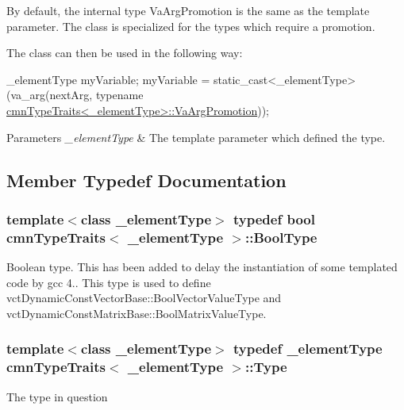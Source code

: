By default, the internal type Va\+Arg\+Promotion is the same as the template parameter. The class is specialized for the types which require a promotion.

The class can then be used in the following way\+:


\begin{DoxyCode}
\_elementType myVariable;
myVariable = \textcolor{keyword}{static\_cast<}\_elementType\textcolor{keyword}{>}(va\_arg(nextArg, \textcolor{keyword}{typename} 
      \hyperlink{classcmn_type_traits_a824cf785b2d249f59bf5d9f03c6e8049}{cmnTypeTraits<\_elementType>::VaArgPromotion}));
\end{DoxyCode}



\begin{DoxyParams}{Parameters}
{\em \+\_\+element\+Type} & The template parameter which defined the type. \\
\hline
\end{DoxyParams}


\subsection{Member Typedef Documentation}
\hypertarget{classcmn_type_traits_aaa41087228a7f165bcd9f4385e644e28}{}
\subsubsection[{Bool\+Type}]{\setlength{\rightskip}{0pt plus 5cm}template$<$class \+\_\+element\+Type$>$ typedef bool {\bf cmn\+Type\+Traits}$<$ \+\_\+element\+Type $>$\+::{\bf Bool\+Type}}\label{classcmn_type_traits_aaa41087228a7f165bcd9f4385e644e28}
Boolean type. This has been added to delay the instantiation of some templated code by gcc 4.. This type is used to define vct\+Dynamic\+Const\+Vector\+Base\+::\+Bool\+Vector\+Value\+Type and vct\+Dynamic\+Const\+Matrix\+Base\+::\+Bool\+Matrix\+Value\+Type. \hypertarget{classcmn_type_traits_aefe66f235207b010b396b5558529a1da}{}
\subsubsection[{Type}]{\setlength{\rightskip}{0pt plus 5cm}template$<$class \+\_\+element\+Type$>$ typedef \+\_\+element\+Type {\bf cmn\+Type\+Traits}$<$ \+\_\+element\+Type $>$\+::{\bf Type}}\label{classcmn_type_traits_aefe66f235207b010b396b5558529a1da}
The type in question \hypertarget{classcmn_type_traits_a824cf785b2d249f59bf5d9f03c6e8049}{}
